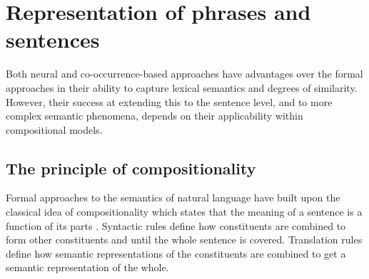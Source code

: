 

\section{Representation of phrases and sentences}
\label{sec:similarity-compounds}

Both neural and co-occurrence-based approaches have advantages over the formal approaches in their ability to capture lexical semantics and degrees of similarity. However, their success at extending this to the sentence level, and to more complex semantic phenomena, depends on their applicability within compositional models.

\subsection{The principle of compositionality}
\label{sec:formal-semantics}

Formal approaches to the semantics of natural language have built upon the
classical idea of compositionality which states that the meaning of a sentence is a
function of its parts \cite{Janssen2001}. Syntactic rules define how constituents are combined
to form other constituents and until the whole sentence is covered. Translation rules define
how semantic representations of the constituents are combined to get a semantic
representation of the whole.

